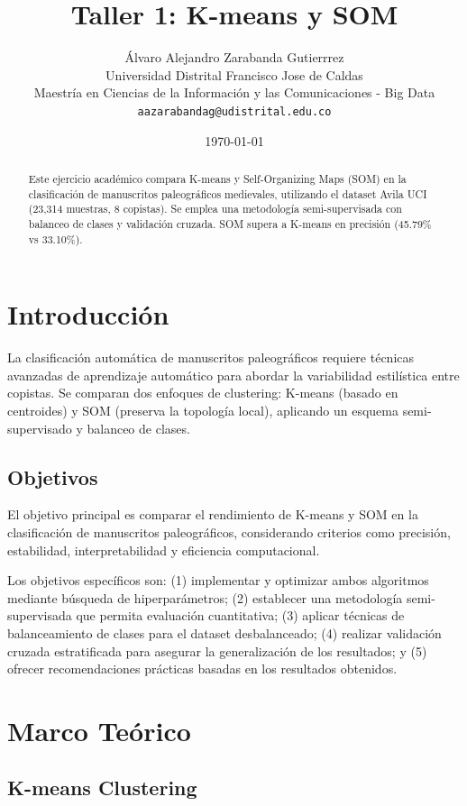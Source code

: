 \documentclass[12pt,a4paper]{article}
\title{\textbf{Taller 1: K-means y SOM}}
\author{
    Álvaro Alejandro Zarabanda Gutierrrez \\
    \small Universidad Distrital Francisco Jose de Caldas \\
    \small Maestría en Ciencias de la Información y las Comunicaciones - Big Data \\
    \small \texttt{aazarabandag@udistrital.edu.co}
}
\date{\today}
\begin{document}
\maketitle

\begin{abstract}
Este ejercicio académico compara K-means y Self-Organizing Maps (SOM) en la clasificación de manuscritos paleográficos medievales, utilizando el dataset Avila UCI (23,314 muestras, 8 copistas). Se emplea una metodología semi-supervisada con balanceo de clases y validación cruzada. SOM supera a K-means en precisión (45.79\% vs 33.10\%).
\end{abstract}

\tableofcontents
\newpage

\section{Introducción}


La clasificación automática de manuscritos paleográficos requiere técnicas avanzadas de aprendizaje automático para abordar la variabilidad estilística entre copistas. Se comparan dos enfoques de clustering: K-means (basado en centroides) y SOM (preserva la topología local), aplicando un esquema semi-supervisado y balanceo de clases.

\subsection{Objetivos}

El objetivo principal es comparar el rendimiento de K-means y SOM en la clasificación de manuscritos paleográficos, considerando criterios como precisión, estabilidad, interpretabilidad y eficiencia computacional.

Los objetivos específicos son: (1) implementar y optimizar ambos algoritmos mediante búsqueda de hiperparámetros; (2) establecer una metodología semi-supervisada que permita evaluación cuantitativa; (3) aplicar técnicas de balanceamiento de clases para el dataset desbalanceado; (4) realizar validación cruzada estratificada para asegurar la generalización de los resultados; y (5) ofrecer recomendaciones prácticas basadas en los resultados obtenidos.

\section{Marco Teórico}

\subsection{K-means Clustering}
\end{document}
